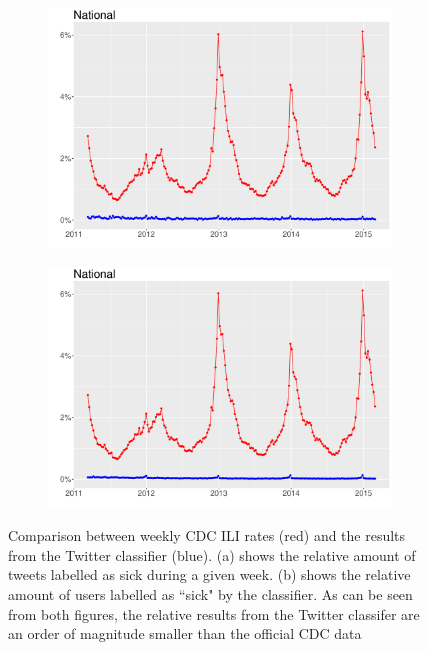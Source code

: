 \documentclass[11pt, a4paper,twoside]{report}\usepackage[]{graphicx}\usepackage[]{color}
\begin{document}
\begin{figure}[H]
\centering
  \begin{subfigure}[t]{0.49\textwidth}
  \includegraphics[width=1\linewidth]{cdc_twitter_comp_nat_raw.pdf}
  \caption{}
  \end{subfigure}
\hfill
  \begin{subfigure}[t]{0.49\textwidth}
  \includegraphics[width=1\linewidth]{cdc_twitter_comp_nat_raw_user.pdf}
  \caption{}
  \end{subfigure}
  \caption{Comparison between weekly CDC ILI rates (red) and the results from the Twitter classifier (blue). (a) shows the relative amount of tweets labelled as sick during a given week. (b) shows the relative amount of users labelled as ``sick" by the classifier. As can be seen from both figures, the relative results from the Twitter classifer are an order of magnitude smaller than the official CDC data}
  \label{fig:naive_comparison_CDC_twitter}
\end{figure}
\end{document}
